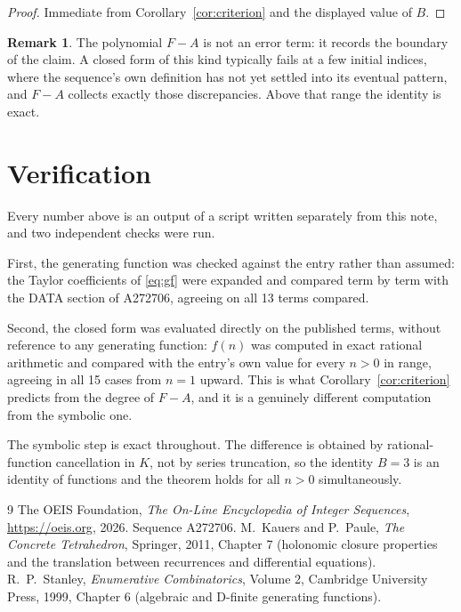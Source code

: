 \documentclass[11pt,a4paper]{article}
\theoremstyle{plain}
\theoremstyle{definition}
\newtheorem{remark}[theorem]{Remark}
\begin{document}
\begin{proof}
Immediate from Corollary~\ref{cor:criterion} and the displayed value of $B$.
\end{proof}

\begin{remark}
The polynomial $F-A$ is not an error term: it records the boundary of the claim. A closed
form of this kind typically fails at a few initial indices, where the sequence's own
definition has not yet settled into its eventual pattern, and $F-A$ collects exactly
those discrepancies. Above that range the identity is exact.
\end{remark}

\section{Verification}

Every number above is an output of a script written separately from this note, and two
independent checks were run.

First, the generating function was checked against the entry rather than assumed: the
Taylor coefficients of \eqref{eq:gf} were expanded and compared term by term with the DATA
section of A272706, agreeing on all 13 terms compared.

Second, the closed form was evaluated directly on the published terms, without reference
to any generating function: $f(n)$ was computed in exact rational arithmetic and compared
with the entry's own value for every $n>0$ in range, agreeing in all 15 cases
from $n=1$ upward. This is what Corollary~\ref{cor:criterion} predicts from the
degree of $F-A$, and it is a genuinely different computation from the symbolic one.

The symbolic step is exact throughout. The difference is obtained by rational-function
cancellation in $K$, not by series truncation, so the identity $B=3$ is an
identity of functions and the theorem holds for all $n>0$ simultaneously.

\begin{thebibliography}{9}
 The OEIS Foundation, \emph{The On-Line Encyclopedia of Integer Sequences},
\url{https://oeis.org}, 2026. Sequence A272706.
 M.~Kauers and P.~Paule, \emph{The Concrete Tetrahedron}, Springer, 2011,
Chapter 7 (holonomic closure properties and the translation between recurrences and
differential equations).
 R.~P.~Stanley, \emph{Enumerative Combinatorics}, Volume 2, Cambridge
University Press, 1999, Chapter 6 (algebraic and D-finite generating functions).
\end{thebibliography}
\end{document}
